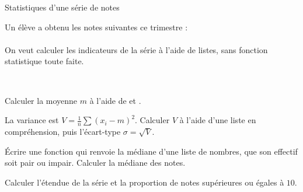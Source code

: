 
\begin{exercice}[2]{Statistiques d'une série de notes}
\begin{codecote}[0.52]
\raggedright
Un élève a obtenu les notes suivantes ce trimestre :\\[1mm]
\\[1mm]
On veut calculer les indicateurs de la série à l'aide de listes, sans fonction statistique toute faite.
\cote
\centering
{}\\[0.5mm]
\end{codecote}
\begin{questions}
  \item Calculer la moyenne $m$ à l'aide de  et .
  \item La variance est $V=\frac1n\sum(x_i-m)^{2}$. Calculer $V$ à l'aide d'une liste en compréhension, puis l'écart-type
    $\sigma=\sqrt V$.
  \item Écrire une fonction  qui renvoie la médiane d'une liste de nombres, que son effectif soit pair ou impair.
    Calculer la médiane des notes.
  \item Calculer l'étendue de la série et la proportion de notes supérieures ou égales à $10$.
\end{questions}
\end{exercice}

